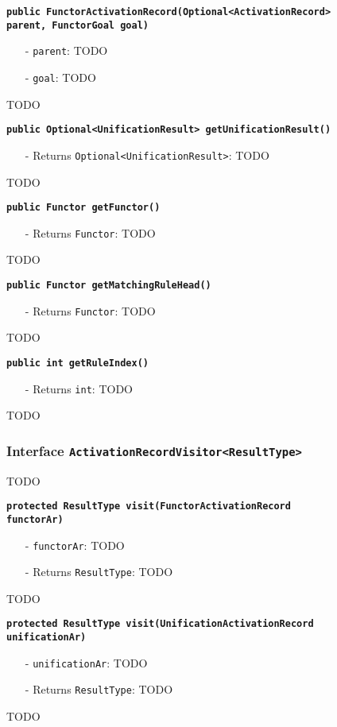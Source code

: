 \documentclass[parskip=full,11pt,twoside]{scrartcl}
\begin{document}
\textbf{\texttt{public FunctorActivationRecord(Optional<ActivationRecord>\\ parent, FunctorGoal goal)}}
\begin{itemize}[noitemsep]
	\item[-] \texttt{parent}: TODO
	\item[-] \texttt{goal}: TODO
\end{itemize}
TODO

\textbf{\texttt{public Optional<UnificationResult> getUnificationResult()}}
\begin{itemize}[noitemsep]
	\item[-] Returns \texttt{Optional<UnificationResult>}: TODO
\end{itemize}
TODO

\textbf{\texttt{public Functor getFunctor()}}
\begin{itemize}[noitemsep]
	\item[-] Returns \texttt{Functor}: TODO
\end{itemize}
TODO

\textbf{\texttt{public Functor getMatchingRuleHead()}}
\begin{itemize}[noitemsep]
	\item[-] Returns \texttt{Functor}: TODO
\end{itemize}
TODO

\textbf{\texttt{public int getRuleIndex()}}
\begin{itemize}[noitemsep]
	\item[-] Returns \texttt{int}: TODO
\end{itemize}
TODO

\subsubsection{Interface \texttt{ActivationRecordVisitor<ResultType>}}
TODO

\textbf{\texttt{protected ResultType visit(FunctorActivationRecord\\functorAr)}}
\begin{itemize}[noitemsep]
	\item[-] \texttt{functorAr}: TODO
	\item[-] Returns \texttt{ResultType}: TODO
\end{itemize}
TODO

\textbf{\texttt{protected ResultType visit(UnificationActivationRecord\\unificationAr)}}
\begin{itemize}[noitemsep]
	\item[-] \texttt{unificationAr}: TODO
	\item[-] Returns \texttt{ResultType}: TODO
\end{itemize}
TODO
\end{document}
